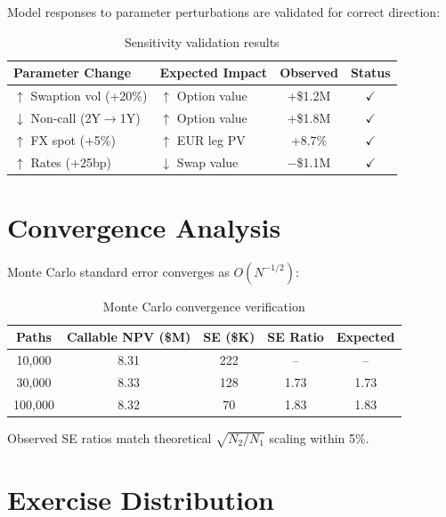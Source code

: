 \documentclass[conference]{IEEEtran}
\begin{document}
Model responses to parameter perturbations are validated for correct direction:

\begin{table}[H]
\centering
\begin{tabular}{llcc}
\toprule
\textbf{Parameter Change} & \textbf{Expected Impact} & \textbf{Observed} & \textbf{Status}\\
\midrule
$\uparrow$ Swaption vol (+20\%) & $\uparrow$ Option value & +\$1.2M & \textcolor{pass}{$\checkmark$}\\
$\downarrow$ Non-call (2Y$\to$1Y) & $\uparrow$ Option value & +\$1.8M & \textcolor{pass}{$\checkmark$}\\
$\uparrow$ FX spot (+5\%) & $\uparrow$ EUR leg PV & +8.7\% & \textcolor{pass}{$\checkmark$}\\
$\uparrow$ Rates (+25bp) & $\downarrow$ Swap value & $-$\$1.1M & \textcolor{pass}{$\checkmark$}\\
\bottomrule
\end{tabular}
\caption{Sensitivity validation results}
\end{table}

\section{Convergence Analysis}

Monte Carlo standard error converges as $O(N^{-1/2})$:

\begin{table}[H]
\centering
\begin{tabular}{ccccc}
\toprule
\textbf{Paths} & \textbf{Callable NPV (\$M)} & \textbf{SE (\$K)} & \textbf{SE Ratio} & \textbf{Expected}\\
\midrule
10,000 & 8.31 & 222 & -- & --\\
30,000 & 8.33 & 128 & 1.73 & 1.73\\
100,000 & 8.32 & 70 & 1.83 & 1.83\\
\bottomrule
\end{tabular}
\caption{Monte Carlo convergence verification}
\end{table}

Observed SE ratios match theoretical $\sqrt{N_2/N_1}$ scaling within 5\%.

\section{Exercise Distribution}
\end{document}

